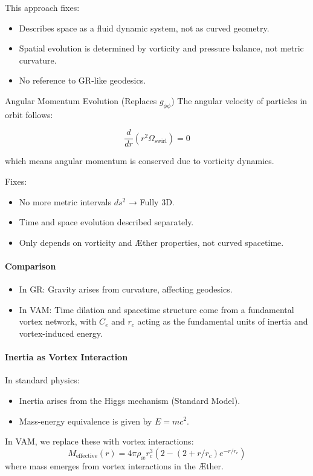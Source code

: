 This approach fixes:

\begin{itemize}
\item Describes space as a fluid dynamic system, not as curved geometry.
\item Spatial evolution is determined by vorticity and pressure balance, not metric curvature.
\item No reference to GR-like geodesics.
\end{itemize}


Angular Momentum Evolution (Replaces $g_{\phi\phi}$)
The angular velocity of particles in orbit follows:

\begin{equation*}
    \frac{d}{dr} \left( r^2 \Omega_\text{swirl} \right) = 0
\end{equation*}

which means angular momentum is conserved due to vorticity dynamics.

Fixes:

\begin{itemize}
\item No more metric intervals $ ds^2 $ → Fully 3D.
\item Time and space evolution described separately.
\item Only depends on vorticity and Æther properties, not curved spacetime.
\end{itemize}



\paragraph{Comparison}
\begin{itemize}
    \item In GR: Gravity arises from curvature, affecting geodesics.
    \item In VAM: Time dilation and spacetime structure come from a fundamental vortex network, with $C_e$ and $r_c$ acting as the fundamental units of inertia and vortex-induced energy.
\end{itemize}

\paragraph{Inertia as Vortex Interaction}
In standard physics:
\begin{itemize}
    \item Inertia arises from the Higgs mechanism (Standard Model).
    \item Mass-energy equivalence is given by $E = mc^2$.
\end{itemize}
In VAM, we replace these with vortex interactions:
\begin{equation*}
    M_\text{effective}(r) = 4\pi \rho_\text{\ae} r_c^3 \left( 2 - (2 + r/r_c) e^{-r / r_c} \right)
\end{equation*}
where mass emerges from vortex interactions in the Æther.

